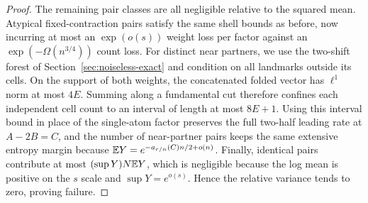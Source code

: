 \begin{proof}
The remaining pair classes are all negligible relative to the squared mean.
Atypical fixed-contraction pairs satisfy the same shell bounds as before, now
incurring at most an \(\exp(o(s))\) weight loss per factor against an
\(\exp(-\Omega(n^{3/4}))\) count loss. For distinct near partners, we use the
two-shift forest of Section~\ref{sec:noiseless-exact} and condition on all
landmarks outside its cells. On the support of both weights, the concatenated
folded vector has \(\ell^1\) norm at most \(4E\). Summing along a fundamental
cut therefore confines each independent cell count to an interval of length at
most \(8E+1\). Using this interval bound in place of the single-atom factor
preserves the full two-half leading rate at \(A-2B=C\), and the number of
near-partner pairs keeps the same extensive entropy margin because
\(\mathbb E Y=e^{-a_{r/n}(C)n/2+o(n)}\). Finally, identical pairs contribute at most
\((\sup Y)N\mathbb E Y\), which is negligible because the log mean is positive on the
\(s\) scale and \(\sup Y=e^{o(s)}\). Hence the relative variance tends to zero,
proving failure.
\end{proof}
